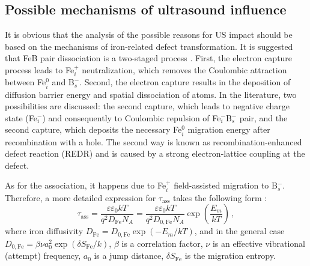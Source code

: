 \documentclass[%
 aip,jap,
 amsmath,amssymb,
 reprint,%
]{revtex4-1}
\begin{document}
\subsection{\label{sec:Meh} Possible mechanisms of ultrasound influence}

It is obvious that the analysis of the possible reasons for US impact should be based on the mechanisms of iron-related defect transformation.
It is suggested that FeB pair dissociation is a two-staged process \cite{FeBAssJAP2014,FeBLight2,KIMERLINGFeB}.
First, the electron capture process leads to Fe$_i^+$ neutralization, which removes the Coulombic attraction between Fe$_i^0$ and B$_s^-$.
Second, the electron capture results in the deposition of diffusion barrier energy and spatial dissociation of atoms.
In the literature, two possibilities are discussed:
the second capture, which leads to negative charge state (Fe$_i^-$) and consequently to Coulombic repulsion of Fe$_i^-$B$_s^-$ pair,
and the second capture, which deposits the necessary Fe$_i^0$ migration energy
after recombination with a hole.
The second way is known\cite{FeBAssJAP2014} as recombination-enhanced defect reaction (REDR) and is caused by a strong electron-lattice coupling at the defect.

As for the association, it happens due to Fe$_i^+$ field-assisted migration to B$_s^-$.
Therefore, a more detailed expression for $\tau_\mathrm{ass}$ takes
the following form \cite{FeBAssJAP2014,FeBJAP2005,FeBKin2019}:
\begin{equation}
\label{eqTass2}
\tau_\mathrm{ass}=\frac{\varepsilon\varepsilon_0 kT}{q^2D_\mathrm{Fe}N_A}=
\frac{\varepsilon\varepsilon_0 kT}{q^2D_\mathrm{0,Fe}N_A}\exp\left(\frac{E_m}{kT}\right)\,,
\end{equation}
where
iron diffusivity
$D_\mathrm{Fe}=D_\mathrm{0,Fe}\exp(-E_m/kT)$,
and in the general case\cite{AZIZ2001,Stavola,WeberFe}
$D_\mathrm{0,Fe}=\beta\nu a_0^2\exp(\delta S_\mathrm{Fe}/k)$,
$\beta$ is a correlation factor,
$\nu$  is an effective vibrational (attempt) frequency,
$a_0$ is a jump distance,
$\delta S_\mathrm{Fe}$ is the migration entropy.
\end{document}
